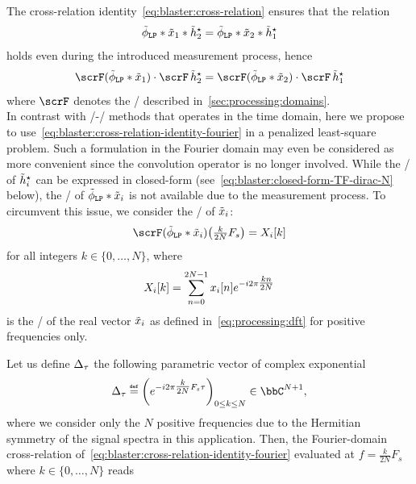 The cross-relation identity~\cref{eq:blaster:cross-relation} ensures that the relation
\begin{equation}
    \idealLowPassFilter
    \ast \contRecordedSignal_1
    \ast  \contFilter_2^\star
    =
    \idealLowPassFilter
    \ast \contRecordedSignal_2
    \ast  \contFilter_1^\star
\end{equation}
holds even during the introduced measurement process, hence
\begin{equation}
    \label{eq:blaster:cross-relation-identity-fourier}
    \fourierTrans(\idealLowPassFilter\ast\contRecordedSignal_1) \cdot \fourierTrans \contFilter_2^\star
    =
    \fourierTrans(\idealLowPassFilter\ast\contRecordedSignal_2) \cdot \fourierTrans \contFilter_1^\star
\end{equation}
where $\fourierTrans$ denotes the \FTdef/ described in~\cref{sec:processing:domains}.
\\In contrast with \SIMO/-\BCE/ methods that operates in the time domain, here we propose to use~\cref{eq:blaster:cross-relation-identity-fourier} in a penalized least-square problem.
Such a formulation in the Fourier domain may even be considered as more convenient since the convolution operator is no longer involved.
While the \FT/ of $\tilde{h}_i^\star$ can be expressed in closed-form (see~\cref{eq:blaster:closed-form-TF-dirac-N} below), the \FT/ of $\idealLowPassFilter\ast\contRecordedSignal_i$ is not available due to the measurement process.
To circumvent this issue, we consider the \DFTdef/ of $\tilde{x}_i$:
\begin{equation}
    \label{eq:blaster:approx-TF}
    \fourierTrans(\idealLowPassFilter\ast\contRecordedSignal_i)
    \kparen{\tfrac{k}{2N}F_s}
    =
    X_i[k]
\end{equation}
for all integers  $k \in \{0, \ldots, N\}$, where
\begin{equation}
    \label{eq:blaster:dft-Xi}
    X_i[k] = \sum_{n=0}^{2N-1}
    x_i[n]
    {e}^{-{i}2\pi \tfrac{kn}{2N}}
\end{equation}
is the \DFT/ of the real vector $\tilde{x}_i$ as defined in~\cref{eq:processing:dft} for positive frequencies only.

\mynewline
Let us define $\Delta_{\tau}$ the following parametric vector of complex exponential
\begin{equation}
    \label{eq:blaster:closed-form-TF-dirac-N}
    \paramVec{\tau} \eqdef
    \left(\cste^{-\csti2\pi\tfrac{k}{2N}F_s \tau}\right)_{0 \leq k \leq N}
    \in\bbC^{N+1}
    ,
\end{equation}
where we consider only the $N$ positive frequencies due to the Hermitian symmetry of the signal spectra in this application.
Then, the Fourier-domain cross-relation of~\cref{eq:blaster:cross-relation-identity-fourier} evaluated at $f = \frac{k}{2N}F_s$ where $k \in \{0,\ldots, N\}$
reads

